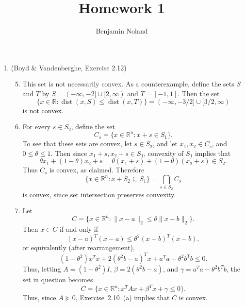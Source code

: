 \documentclass[letterpaper,12pt]{article}
\title{Homework 1}
\author{Benjamin Noland}
\date{}
\DeclareMathOperator{\dist}{dist}
\begin{document}
\maketitle

\begin{enumerate}
\item (Boyd \& Vandenberghe, Exercise 2.12)
\begin{enumerate}
\setcounter{enumii}{4}
\item This set is not necessarily convex. As a counterexample, define
  the sets $S$ and $T$ by $S = (-\infty, -2] \cup [2, \infty)$ and
  $T = [-1, 1]$. Then the set
  \begin{equation*}
    \{x \in \mathbb{R} : \dist(x, S) \leq \dist(x, T)\}
      = (-\infty, -3/2] \cup [3/2, \infty)
  \end{equation*}
  is not convex.

\item For every $s \in S_2$, define the set
  \begin{equation*}
    C_s = \{x \in \mathbb{R}^n : x + s \in S_1\}.
  \end{equation*}
  To see that these sets are convex, let $s \in S_2$, and let
  $x_1, x_2 \in C_s$, and $0 \leq \theta \leq 1$. Then since
  $x_1 + s, x_2 + s \in S_1$, convexity of $S_1$ implies that
  \begin{equation*}
    \theta x_1 + (1 - \theta) x_2 + s
      = \theta (x_1 + s) + (1 - \theta)(x_2 + s) \in S_2.
  \end{equation*}
  Thus $C_s$ is convex, as claimed. Therefore
  \begin{equation*}
    \{x \in \mathbb{R}^n : x + S_2 \subseteq S_1\} = \bigcap_{s \in S_2} C_s
  \end{equation*}
  is convex, since set intersection preserves convexity.

\item Let
  \begin{equation*}
    C = \{x \in \mathbb{R}^n :
      \lVert x - a \rVert_2 \leq \theta \lVert x - b \rVert_2\}.
  \end{equation*}
  Then $x \in C$ if and only if
  \begin{equation*}
    (x - a)^T (x - a) \leq \theta^2 (x - b)^T (x - b),
  \end{equation*}
  or equivalently (after rearrangement),
  \begin{equation*}
    (1 - \theta^2) x^T x + 2(\theta^2 b - a)^T x
      + a^T a - \theta^2 b^T b \leq 0.
  \end{equation*}
  Thus, letting $A = (1 - \theta^2)I$, $\beta = 2(\theta^2 b - a)$,
  and $\gamma = a^T a - \theta^2 b^T b$, the set in question becomes
  \begin{equation*}
    C = \{x \in \mathbb{R}^n : x^T Ax + \beta^T x + \gamma \leq 0\}.
  \end{equation*}
  Thus, since $A \succeq 0$, Exercise~2.10~(a) implies that $C$ is
  convex.
\end{enumerate}


\end{enumerate}
\end{document}
